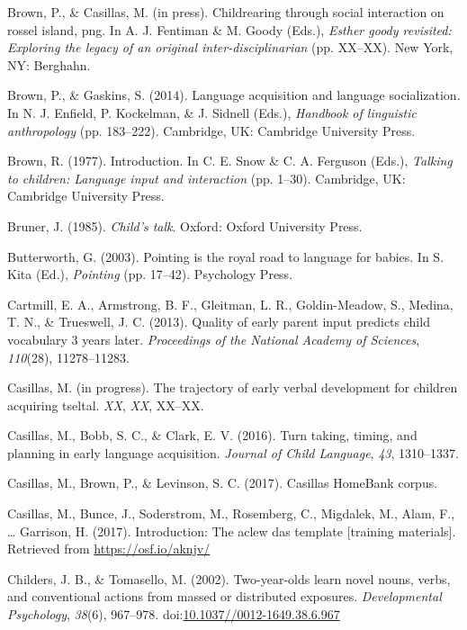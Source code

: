 \documentclass[floatsintext,man]{apa6}
\theoremstyle{definition}
\theoremstyle{definition}
\theoremstyle{definition}
\theoremstyle{remark}
\begin{document}
\hypertarget{ref-brownIPchildrearing}{}
Brown, P., \& Casillas, M. (in press). Childrearing through social
interaction on rossel island, png. In A. J. Fentiman \& M. Goody (Eds.),
\emph{Esther goody revisited: Exploring the legacy of an original
inter-disciplinarian} (pp. XX--XX). New York, NY: Berghahn.

\hypertarget{ref-brown2014language}{}
Brown, P., \& Gaskins, S. (2014). Language acquisition and language
socialization. In N. J. Enfield, P. Kockelman, \& J. Sidnell (Eds.),
\emph{Handbook of linguistic anthropology} (pp. 183--222). Cambridge,
UK: Cambridge University Press.

\hypertarget{ref-brown1997introduction}{}
Brown, R. (1977). Introduction. In C. E. Snow \& C. A. Ferguson (Eds.),
\emph{Talking to children: Language input and interaction} (pp. 1--30).
Cambridge, UK: Cambridge University Press.

\hypertarget{ref-bruner1985childs}{}
Bruner, J. (1985). \emph{Child's talk}. Oxford: Oxford University Press.

\hypertarget{ref-butterworth2003pointing}{}
Butterworth, G. (2003). Pointing is the royal road to language for
babies. In S. Kita (Ed.), \emph{Pointing} (pp. 17--42). Psychology
Press.

\hypertarget{ref-cartmill2013quality}{}
Cartmill, E. A., Armstrong, B. F., Gleitman, L. R., Goldin-Meadow, S.,
Medina, T. N., \& Trueswell, J. C. (2013). Quality of early parent input
predicts child vocabulary 3 years later. \emph{Proceedings of the
National Academy of Sciences}, \emph{110}(28), 11278--11283.

\hypertarget{ref-casillasIPtrajectory}{}
Casillas, M. (in progress). The trajectory of early verbal development
for children acquiring tseltal. \emph{XX}, \emph{XX}, XX--XX.

\hypertarget{ref-casillas2016turn}{}
Casillas, M., Bobb, S. C., \& Clark, E. V. (2016). Turn taking, timing,
and planning in early language acquisition. \emph{Journal of Child
Language}, \emph{43}, 1310--1337.

\hypertarget{ref-Casillas-HB}{}
Casillas, M., Brown, P., \& Levinson, S. C. (2017). Casillas HomeBank
corpus.

\hypertarget{ref-casillas2017ACLEWDAS}{}
Casillas, M., Bunce, J., Soderstrom, M., Rosemberg, C., Migdalek, M.,
Alam, F., \ldots{} Garrison, H. (2017). Introduction: The aclew das
template {[}training materials{]}. Retrieved from
\url{https://osf.io/aknjv/}

\hypertarget{ref-childers2002two}{}
Childers, J. B., \& Tomasello, M. (2002). Two-year-olds learn novel
nouns, verbs, and conventional actions from massed or distributed
exposures. \emph{Developmental Psychology}, \emph{38}(6), 967--978.
doi:\href{https://doi.org/10.1037//0012-1649.38.6.967}{10.1037//0012-1649.38.6.967}
\end{document}
